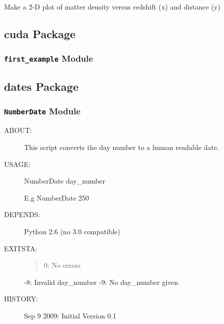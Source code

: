 \documentclass[letterpaper,10pt,english]{sphinxmanual}
\begin{document}

\begin{fulllineitems}
\label{SamPy.cosmology:SamPy.cosmology.distances.plot_dist_ony}
Make a 2-D plot of matter density versus redshift (x) and distance (y)

\end{fulllineitems}



\subsection{cuda Package}
\label{SamPy.cuda:cuda-package}\label{SamPy.cuda::doc}

\subsubsection{\texttt{first\_example} Module}
\label{SamPy.cuda:first-example-module}

\subsection{dates Package}
\label{SamPy.dates::doc}\label{SamPy.dates:dates-package}

\subsubsection{\texttt{NumberDate} Module}
\label{SamPy.dates:numberdate-module}\label{SamPy.dates:module-SamPy.dates.NumberDate}
\begin{description}
\item[{ABOUT:}] \leavevmode
This script converts the day number to a human readable date.

\item[{USAGE:   }] \leavevmode
NumberDate day\_number

E.g NumberDate 250

\item[{DEPENDS:}] \leavevmode
Python 2.6 (no 3.0 compatible)

\item[{EXITSTA:  }] \leavevmode\begin{quote}

0: No errors
\end{quote}

-8: Invalid day\_number
-9: No day\_number given

\item[{HISTORY:}] \leavevmode
Sep 9 2009: Initial Version 0.1

\end{description}
\end{document}

